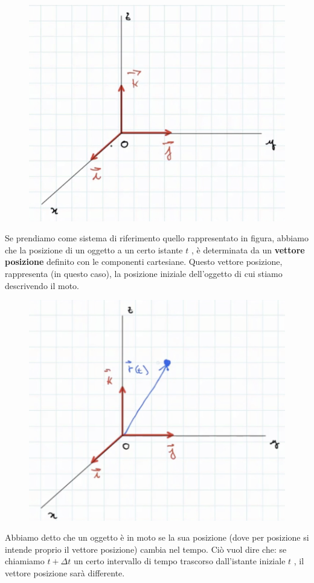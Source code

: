 \documentclass[a4paper]{book}
\begin{document}
\begin{figure}[h]
\begin{center}
\includegraphics[width = 0.5 \textwidth]{sistema riferimento2}
\label{fig:riferimento2}
\end{center}
\end{figure}

Se prendiamo come sistema di riferimento quello rappresentato in figura, abbiamo che la posizione di un oggetto a un certo istante $ t $ , è determinata da un \textbf{vettore posizione} definito con le componenti cartesiane. 
\newpage
Questo vettore posizione, rappresenta (in questo caso), la posizione iniziale dell'oggetto di cui stiamo descrivendo il moto. 

\begin{figure}[h]
\begin{center}
\includegraphics[width = 0.5 \textwidth]{sistema riferimento3}
\label{fig:riferimento3}
\end{center}
\end{figure}

Abbiamo detto che un oggetto è in moto se la sua posizione (dove per posizione si intende proprio il vettore posizione) cambia nel tempo. Ciò vuol dire che: se chiamiamo $ t + \Delta t $ un certo intervallo di tempo trascorso dall'istante iniziale $ t $ , il vettore posizione sarà differente.
\end{document}
